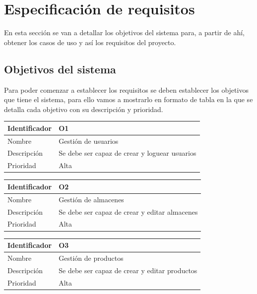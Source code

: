 \chapter{Especificación de requisitos}
\label{requisitos}
En esta sección se van a detallar los objetivos del sistema para, a partir de ahí, obtener los casos de uso y así los requisitos del proyecto.
\section{Objetivos del sistema}
Para poder comenzar a establecer los requisitos se deben establecer los objetivos que tiene el sistema, para ello vamos a mostrarlo en formato de tabla en la que se detalla cada objetivo con su descripción y prioridad.

\vspace{1em}
\par
\begin{tabular}{||p{3cm}|p{11cm}||} 
\hline
Identificador & O1 \\ [0.5ex] 
\hline\hline
Nombre & Gestión de usuarios \\ 
\hline
Descripción & Se debe ser capaz de crear y loguear usuarios \\
\hline
Prioridad & Alta \\ [1ex] 
\hline
\end{tabular}

\vspace{1em}
\par
\begin{tabular}{||p{3cm}|p{11cm}||} 
\hline
Identificador & O2 \\ [0.5ex] 
\hline\hline
Nombre & Gestión de almacenes \\ 
\hline
Descripción & Se debe ser capaz de crear y editar almacenes \\
\hline
Prioridad & Alta \\ [1ex] 
\hline
\end{tabular}

\vspace{1em}
\par
\begin{tabular}{||p{3cm}|p{11cm}||} 
\hline
Identificador & O3 \\ [0.5ex] 
\hline\hline
Nombre & Gestión de productos \\ 
\hline
Descripción & Se debe ser capaz de crear y editar productos \\
\hline
Prioridad & Alta \\ [1ex] 
\hline
\end{tabular}

